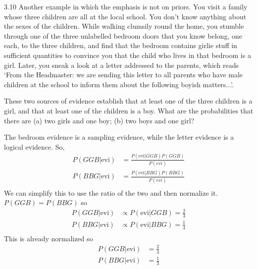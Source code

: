 \documentclass[12pt, a4paper]{article}
\begin{document}
\begin{prob}{3.10}
    Another example in which the emphasis is not on priors. You visit a family whose three children are all at the local school. You don't know anything about the sexes of the children. While walking clumsily round the home, you stumble through one of the three unlabelled bedroom doors that you know belong, one each, to the three children, and find that the bedroom contains girlie stuff in sufficient quantities to convince you that the child who lives in that bedroom is a girl. Later, you sneak a look at a letter addressed to the parents, which reads `From the Headmaster: we are sending this letter to all parents who have male children at the school to inform them about the following boyish matters...'.
    
    These two sources of evidence establish that at least one of the three children is a girl, and that at least one of the children is a boy. What are the probabilities that there are (a) two girls and one boy; (b) two boys and one girl?
\end{prob}
\begin{sol}
    The bedroom evidence is a sampling evidence, while the letter evidence is a logical evidence. So, 
    \begin{align*}
        P(GGB | \text{evi}) &= \frac{P(\text{evi}|GGB)P(GGB)}{P(evi)} \\
        P(BBG | \text{evi}) &= \frac{P(\text{evi}|BBG)P(BBG)}{P(evi)} \\
    \end{align*}
    We can simplify this to use the ratio of the two and then normalize it. $P(GGB) = P(BBG)$ so
    \begin{align*}
        P(GGB | \text{evi}) &\propto P(\text{evi}|GGB) = \frac{2}{3} \\
        P(BBG | \text{evi}) &\propto P(\text{evi}|BBG) = \frac{1}{3} \\
    \end{align*}
    This is already normalized so
    \begin{align*}
        P(GGB | \text{evi}) &= \frac{2}{3} \\
        P(BBG | \text{evi}) &= \frac{1}{3} \\
    \end{align*}
\end{sol}
\bigskip
\end{document}

